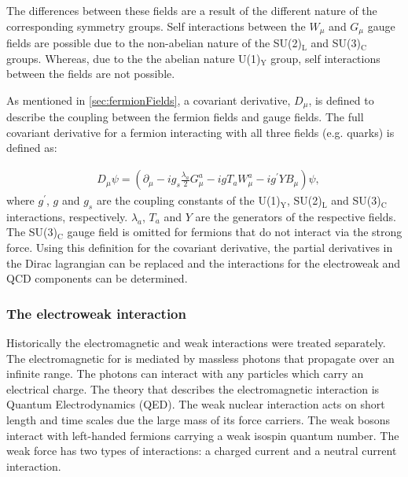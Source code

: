 The differences between these fields are a result of the different nature of the corresponding symmetry groups. Self interactions between the $W_\mu$ and $G_\mu$ gauge fields are possible due to the non-abelian nature of the SU(2)$_\mathrm{L}$ and SU(3)$_\mathrm{C}$ groups. Whereas, due to the the abelian nature U(1)$_\mathrm{Y}$ group, self interactions between the fields are not possible. 

As mentioned in \cref{sec:fermionFields}, a covariant derivative, $D_\mu$, is defined to describe the coupling between the fermion fields and gauge fields. The full covariant derivative for a fermion interacting with all three fields (e.g. quarks) is defined as: 

\begin{equation}
    \label{eq:covaariantDerv}
    \begin{aligned}
        & D_\mu \psi = \left(\partial_\mu - ig_s\frac{\lambda_a}{2}G^a_\mu - igT_aW^a_\mu - ig^\prime YB_\mu\right)\psi,
    \end{aligned}
\end{equation}
where $g^\prime$, $g$ and $g_s$ are the coupling constants of the U(1)$_\mathrm{Y}$, SU(2)$_\mathrm{L}$ and SU(3)$_\mathrm{C}$ interactions, respectively. $\lambda_a$, $T_a$ and $Y$ are the generators of the respective fields. The SU(3)$_\mathrm{C}$ gauge field is omitted for fermions that do not interact via the strong force. Using this definition for the covariant derivative, the partial derivatives in the Dirac lagrangian can be replaced and the interactions for the electroweak and QCD components can be determined. 

\subsubsection{The electroweak interaction}\label{sec:electroweak}
Historically the electromagnetic and weak interactions were treated separately. The electromagnetic for is mediated by massless photons that propagate over an infinite range. The photons can interact with any particles which carry an electrical charge. The theory that describes the electromagnetic interaction is Quantum Electrodynamics (QED). The weak nuclear interaction acts on short length and time scales due the large mass of its force carriers. The weak bosons interact with left-handed fermions carrying a weak isospin quantum number. The weak force has two types of interactions: a charged current and a neutral current interaction.  


